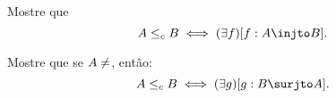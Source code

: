 \begin{exercise}
    Mostre que
    $$
    A \leq_c B \iff (\exists f)[f : A \injto B].
    $$
\end{exercise}

\begin{exercise}
    Mostre que se $A \not = \empty$, então:
    $$
    A \leq_c B \iff (\exists g)[g : B \surjto A].
    $$
\end{exercise}
